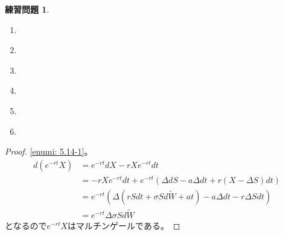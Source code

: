 \documentclass[uplatex]{jsarticle}
\theoremstyle{definition}
\newtheorem{prob}[prob]{練習問題}
\begin{document}
\begin{prob}\label{prob: 5.14}
  \begin{enumerate}
    \item \label{enumi: 5.14-1}
    \item \label{enumi: 5.14-2}
    \item \label{enumi: 5.14-3}
    \item \label{enumi: 5.14-4}
    \item \label{enumi: 5.14-5}
    \item \label{enumi: 5.14-6}
  \end{enumerate}
\end{prob}

\begin{proof}
  \ref{enumi: 5.14-1}。
  \begin{align*}
    d(e^{-rt}X)
    &= e^{-rt}dX - rXe^{-rt}dt \\
    &= - rXe^{-rt}dt
    + e^{-rt}\left( \Delta dS - a\Delta dt + r(X-\Delta S) dt \right) \\
    &= e^{-rt}\left( \Delta \left( rSdt + \sigma Sd\tilde{W} + at \right)
    - a\Delta dt - r\Delta S dt \right) \\
    &= e^{-rt} \Delta \sigma Sd\tilde{W}
  \end{align*}
  となるので\(e^{-rt}X\)はマルチンゲールである。


\end{proof}
\end{document}
